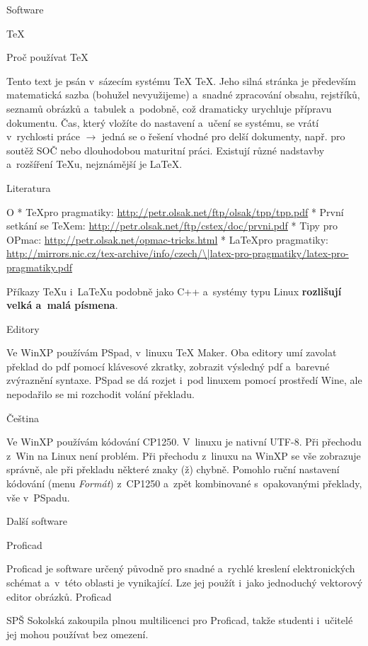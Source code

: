  \chap Software
 
 
\sec \TeX

\secc Proč používat \TeX

Tento text je psán v~sázecím systému \ii TeX \TeX . Jeho silná stránka je především matematická sazba 
(bohužel nevyužijeme) a~snadné zpracování obsahu, rejstříků, seznamů obrázků a~tabulek a~podobně, což dramaticky urychluje přípravu dokumentu. Čas, který vložíte do nastavení a~učení se systému, se vrátí v~rychlosti práce $\rightarrow$ jedná se o řešení vhodné pro delší dokumenty, např. pro soutěž SOČ nebo dlouhodobou maturitní práci. Existují různé nadstavby a~rozšíření \TeX{}u, nejznámější je \LaTeX{}.
 

\secc Literatura 

\begitems \style O
* \TeX pro pragmatiky: \url{http://petr.olsak.net/ftp/olsak/tpp/tpp.pdf}
* První setkání se \TeX{}em: \url{http://petr.olsak.net/ftp/cstex/doc/prvni.pdf} 
* Tipy pro OPmac: \url{http://petr.olsak.net/opmac-tricks.html}
* \LaTeX pro pragmatiky: \url{http://mirrors.nic.cz/tex-archive/info/czech/\|latex-pro-pragmatiky/latex-pro-pragmatiky.pdf} \emergencystretch=2cm
\enditems

Příkazy \TeX{}u i~\LaTeX{}u podobně jako C++ a~systémy typu Linux {\bf rozlišují velká a~malá písmena}. 
 

\secc Editory 

Ve WinXP používám PSpad, v~linuxu TeX Maker. Oba editory umí zavolat překlad do pdf pomocí klávesové zkratky, zobrazit výsledný pdf a~barevné zvýraznění syntaxe. PSpad se dá rozjet i~pod linuxem pomocí prostředí Wine, ale nepodařilo se mi rozchodit volání překladu. 

\secc Čeština 

Ve WinXP používám kódování CP1250. V~linuxu je nativní UTF-8. Při přechodu z~Win na Linux není problém. Při přechodu z~linuxu na WinXP se vše zobrazuje správně, ale při překladu některé znaky (ž) chybně. Pomohlo ruční nastavení kódování (menu {\it Formát}) z~CP1250 a~zpět kombinované s~opakovanými překlady, vše v~PSpadu.   
 
\sec Další software 

\secc Proficad 

Proficad je software určený původně pro snadné a~rychlé kreslení elektronických schémat a~v~této oblasti je vynikající. Lze jej použít i~jako jednoduchý vektorový editor obrázků. \ii Proficad 

SPŠ Sokolská zakoupila plnou multilicenci pro Proficad, takže studenti i~učitelé jej mohou používat bez omezení. 

